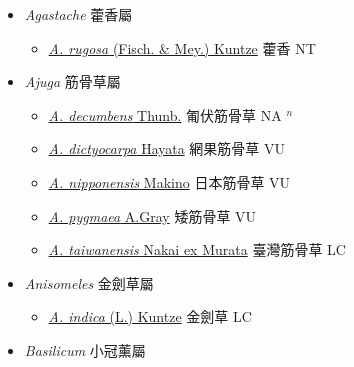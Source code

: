 
  \begin{itemize}
 \item[] \textit{Agastache} 藿香屬
                    
  \begin{itemize}
        \item[] \href{http://www.theplantlist.org/tpl1.1/search?q=Agastache+rugosa}{\textit{A. rugosa} (Fisch. \& Mey.) Kuntze}   藿香 NT
  \end{itemize}
 \item[] \textit{Ajuga} 筋骨草屬
                    
  \begin{itemize}
        \item[] \href{http://www.theplantlist.org/tpl1.1/search?q=Ajuga+decumbens}{\textit{A. decumbens} Thunb.}   匍伏筋骨草 NA $^n$
        \item[] \href{http://www.theplantlist.org/tpl1.1/search?q=Ajuga+dictyocarpa}{\textit{A. dictyocarpa} Hayata}   網果筋骨草 VU
        \item[] \href{http://www.theplantlist.org/tpl1.1/search?q=Ajuga+nipponensis}{\textit{A. nipponensis} Makino}   日本筋骨草 VU
        \item[] \href{http://www.theplantlist.org/tpl1.1/search?q=Ajuga+pygmaea}{\textit{A. pygmaea} A.Gray}   矮筋骨草 VU
        \item[] \href{http://www.theplantlist.org/tpl1.1/search?q=Ajuga+taiwanensis}{\textit{A. taiwanensis} Nakai ex Murata}   臺灣筋骨草 LC
  \end{itemize}
 \item[] \textit{Anisomeles} 金劍草屬
                    
  \begin{itemize}
        \item[] \href{http://www.theplantlist.org/tpl1.1/search?q=Anisomeles+indica}{\textit{A. indica} (L.) Kuntze}   金劍草 LC
  \end{itemize}
 \item[] \textit{Basilicum} 小冠薰屬
                    

\end{itemize}
